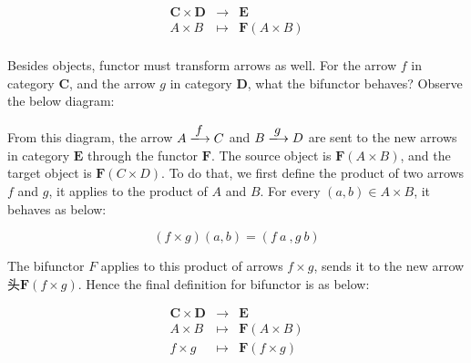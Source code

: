 \documentclass{article}
\begin{document}
\[
\begin{array}{rcl}
\pmb{C} \times \pmb{D} & \longrightarrow & \pmb{E} \\
A \times B & \longmapsto & \mathbf{F}(A \times B) \\
\end{array}
\]

Besides objects, functor must transform arrows as well. For the arrow $f$ in category $\pmb{C}$, and the arrow $g$ in category $\pmb{D}$, what the bifunctor behaves? Observe the below diagram:

\begin{center}
\end{center}

From this diagram, the arrow $A \arrowto{f} C$ and $B \arrowto{g} D$ are sent to the new arrows in category $\pmb{E}$ through the functor $\mathbf{F}$. The source object is $\mathbf{F}(A \times B)$, and the target object is $\mathbf{F}(C \times D)$. To do that, we first define the product of two arrows $f$ and $g$, it applies to the product of $A$ and $B$. For every $(a, b) \in A \times B$, it behaves as below:

\[
(f \times g)(a, b) = (f\ a\ , g\ b)
\]

The bifunctor $F$ applies to this product of arrows $f \times g$, sends it to the new arrow 头$\mathbf{F}(f \times g)$. Hence the final definition for bifunctor is as below:

\[
\begin{array}{rcl}
\pmb{C} \times \pmb{D} & \longrightarrow & \pmb{E} \\
A \times B & \longmapsto & \mathbf{F}(A \times B) \\
f \times g & \longmapsto & \mathbf{F}(f \times g) \\
\end{array}
\]
\end{document}
